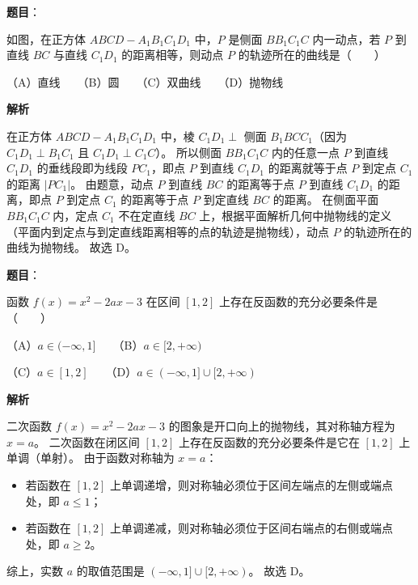 \begin{answer}

\textbf{题目}：

如图，在正方体 $ABCD-A_1B_1C_1D_1$ 中，$P$ 是侧面 $BB_1C_1C$ 内一动点，若 $P$ 到直线 $BC$ 与直线 $C_1D_1$ 的距离相等，则动点 $P$ 的轨迹所在的曲线是\mbox{（　　）}
\nopagebreak[4]
\begin{center}\end{center}
\nopagebreak[4]
（A）直线　　（B）圆　　（C）双曲线　　（D）抛物线

\textbf{解析}

在正方体 $ABCD-A_1B_1C_1D_1$ 中，棱 $C_1D_1\perp$ 侧面 $B_1BCC_1$（因为 $C_1D_1\perp B_1C_1$ 且 $C_1D_1\perp C_1C$）。
所以侧面 $BB_1C_1C$ 内的任意一点 $P$ 到直线 $C_1D_1$ 的垂线段即为线段 $PC_1$，即点 $P$ 到直线 $C_1D_1$ 的距离就等于点 $P$ 到定点 $C_1$ 的距离 $|PC_1|$。
由题意，动点 $P$ 到直线 $BC$ 的距离等于点 $P$ 到直线 $C_1D_1$ 的距离，即点 $P$ 到定点 $C_1$ 的距离等于点 $P$ 到定直线 $BC$ 的距离。
在侧面平面 $BB_1C_1C$ 内，定点 $C_1$ 不在定直线 $BC$ 上，根据平面解析几何中抛物线的定义（平面内到定点与到定直线距离相等的点的轨迹是抛物线），动点 $P$ 的轨迹所在的曲线为抛物线。
故选 D。


\end{answer}
\begin{answer}

\textbf{题目}：

函数 $f(x)=x^2-2ax-3$ 在区间 $[1, 2]$ 上存在反函数的充分必要条件是\mbox{（　　）}

（A）$a\in(-\infty, 1]$　　（B）$a\in[2, +\infty)$

（C）$a\in[1, 2]$　　（D）$a\in(-\infty, 1]\cup[2, +\infty)$

\textbf{解析}

二次函数 $f(x)=x^2-2ax-3$ 的图象是开口向上的抛物线，其对称轴方程为 $x=a$。
二次函数在闭区间 $[1, 2]$ 上存在反函数的充分必要条件是它在 $[1, 2]$ 上单调（单射）。
由于函数对称轴为 $x=a$：
\begin{itemize}
\item 若函数在 $[1, 2]$ 上单调递增，则对称轴必须位于区间左端点的左侧或端点处，即 $a\le 1$；
\item 若函数在 $[1, 2]$ 上单调递减，则对称轴必须位于区间右端点的右侧或端点处，即 $a\ge 2$。
\end{itemize}
综上，实数 $a$ 的取值范围是 $(-\infty, 1]\cup [2, +\infty)$。
故选 D。


\end{answer}
